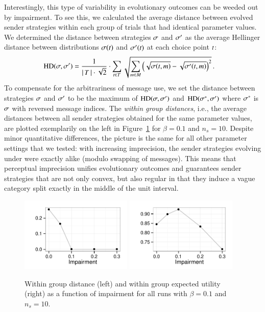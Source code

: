 \documentclass[fleqn,reqno,10pt]{article}
\newcommand{\rdd}{\acro{rdd}} %
\newcommand{\toler}{\ensuremath{\beta}} %
\begin{document}
Interestingly, this type of variability in evolutionary outcomes can
be weeded out by impairment. To see this, we calculated the average
distance between evolved sender strategies within each group of trials
that had identical parameter values. We determined the distance
between strategies $\sigma$ and $\sigma'$ as the average Hellinger
distance between distributions $\sigma(t)$ and
$\sigma'(t)$ at each choice point $t$:
\begin{align*}
  \text{HD}(\sigma,\sigma') & = \frac{1}{{\left \lvert \, T \, \right\rvert \cdot
     \sqrt{2}}} \cdot  \sum_{t \in T} 
 \sqrt{\sum_{m \in  M}
         \left ( \sqrt{\sigma(t,m)} -
         \sqrt{\sigma'(t,m)} \right )^2 }\,.
\end{align*}
To compensate for the arbitrariness of message use, we set the
distance between strategies $\sigma$ and $\sigma'$ to be the maximum
of $\text{HD}(\sigma,\sigma')$ and $\text{HD}(\sigma^*,\sigma')$
where $\sigma^*$ is $\sigma$ with reversed message indices. The
\emph{within group distances}, i.e., the average distances between all
sender strategies obtained for the same parameter values, are plotted
exemplarily on the left in Figure~\ref{fig:GroupMeasures} for $\beta =
0.1$ and $n_s = 10$. Despite minor quantitative differences, the
picture is the same for all other parameter settings that we tested:
with increasing imprecision, the sender strategies evolving under \rdd
were exactly alike (modulo swapping of messages). This means that
perceptual imprecision unifies evolutionary outcomes and guarantees
sender strategies that are not only convex, but also regular in that
they induce a vague category split exactly in the middle of the unit
interval.

\begin{figure}
  \centering

    \includegraphics[width=0.475\textwidth]{plots/WithinGroupDistanceConcise.pdf}
    \hfill
    \includegraphics[width=0.475\textwidth]{plots/WithinGroupEUConcise.pdf}

    \caption{Within group distance (left) and within group expected
      utility (right) as a function of impairment for all runs with
      $\toler = 0.1$ and $n_s = 10$.}
  \label{fig:GroupMeasures}
\end{figure}
\end{document}
